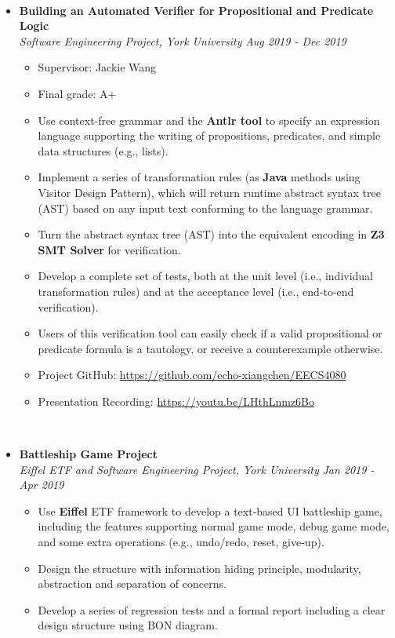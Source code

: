 \documentclass[a4paper,10pt,titlepage]{article}
\begin{document}
~\\
\begin{itemize}%
	\item {\bf Building an Automated Verifier for Propositional and Predicate Logic}
	\\\emph {Software Engineering Project, York University} {\hfill \emph{Aug 2019 - Dec 2019}}
	\begin{itemize}%
		\item Supervisor: Jackie Wang
		\item Final grade: A+
		\item Use context-free grammar and the {\bf Antlr tool} to specify an expression language supporting the writing of propositions, predicates, and simple data structures (e.g., lists).
		\item Implement a series of transformation rules (as {\bf Java} methods using Visitor Design Pattern), which will return runtime abstract syntax tree (AST) based on any input text conforming to the language grammar.
		\item Turn the abstract syntax tree (AST) into the equivalent encoding in {\bf Z3 SMT Solver} for verification.
		\item Develop a complete set of tests, both at the unit level (i.e., individual transformation rules) and at the acceptance level (i.e., end-to-end verification).
		\item Users of this verification tool can easily check if a valid propositional or predicate formula is a tautology, or receive a counterexample otherwise.
		\item Project GitHub: \url{https://github.com/echo-xiangchen/EECS4080}
		\item Presentation Recording: \url{https://youtu.be/LHthLnmz6Bo}
	\end{itemize}
\end{itemize}
~\\
\begin{itemize}%
	\item {\bf Battleship Game Project}
	\\\emph {Eiffel ETF and Software Engineering Project, York University} {\hfill \emph{Jan 2019 - Apr 2019}}
	\begin{itemize}%
		\item Use {\bf Eiffel} ETF framework to develop a text-based UI battleship game, including the features supporting normal game mode, debug game mode, and some extra operations (e.g., undo/redo, reset, give-up).
		\item Design the structure with information hiding principle, modularity, abstraction and separation of concerns.
		\item Develop a series of regression tests and a formal report including a clear design structure using BON diagram.
	\end{itemize}
\end{itemize}
\end{document}
